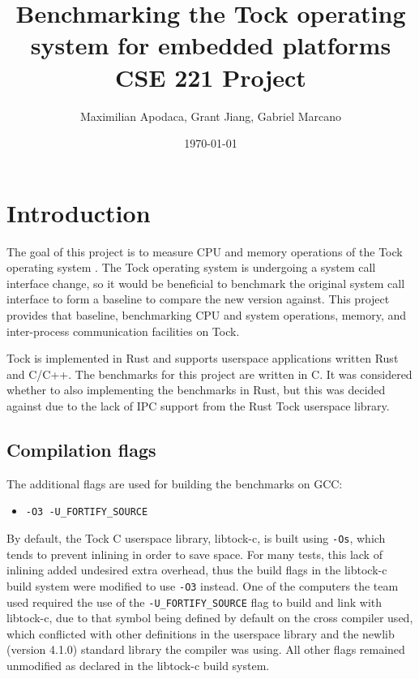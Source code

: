 \documentclass{article}
\title{Benchmarking the Tock operating system for embedded platforms \\[0.2em]\smaller{} CSE 221 Project}
\author{Maximilian Apodaca, Grant Jiang, Gabriel Marcano}
\date{\today}
\begin{document}
\maketitle

\section{Introduction}

The goal of this project is to measure CPU and memory operations of the Tock operating system \cite{levy17multiprogramming}. The Tock operating system is undergoing a system call interface change, so it would be beneficial to benchmark the original system call interface to form a baseline to compare the new version against. This project provides that baseline, benchmarking CPU and system operations, memory, and inter-process communication facilities on Tock. %

Tock is implemented in Rust and supports userspace applications written Rust and C/C++. The benchmarks for this project are written in C. It was considered whether to also implementing the benchmarks in Rust, but this was decided against due to the lack of IPC support from the Rust Tock userspace library.

\subsection{Compilation flags}
The additional flags are used for building the benchmarks on GCC:

\begin{itemize}
    \item \texttt{-O3 -U\_FORTIFY\_SOURCE}
\end{itemize}

By default, the Tock C userspace library, libtock-c, is built using \texttt{-Os}, which tends to prevent inlining in order to save space. For many tests, this lack of inlining added undesired extra overhead, thus the build flags in the libtock-c build system were modified to use \texttt{-O3} instead. One of the computers the team used required the use of the \texttt{-U\_FORTIFY\_SOURCE} flag to build and link with libtock-c, due to that symbol being defined by default on the cross compiler used, which conflicted with other definitions in the userspace library and the newlib (version 4.1.0) standard library the compiler was using. All other flags remained unmodified as declared in the libtock-c build system.
\end{document}
